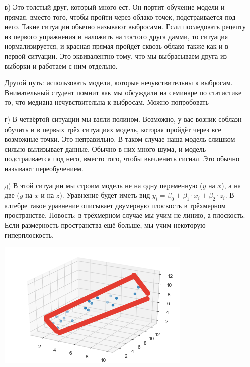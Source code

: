 \documentclass[12pt, a4paper, oneside]{article}
\begin{document}
{\begin{enumerate}
		\item[в)]  Это толстый друг, который много ест.  Он портит обучение модели и прямая, вместо того, чтобы пройти через облако точек, подстраивается под него. Такие ситуации обычно называют выбросами. Если последовать рецепту из первого упражнения и наложить на тостого друга дамми, то ситуация нормализируется, и красная прямая пройдёт сквозь облако также как и в первой ситуации. Это эквивалентно тому, что мы выбрасываем друга из выборки и работаем с ним отдельно.
		
		Другой путь: использовать модели, которые нечувствительны к выбросам. Внимательный студент помнит как мы обсуждали на семинаре по статистике то, что медиана нечувствительна к выбросам. Можно попробовать 
		
		\item[г)]  В четвёртой ситуации мы взяли полином. Возможно, у вас возник соблазн обучить и в первых трёх ситуациях модель, которая пройдёт через все возможные точки. Это неправильно. В таком случае наша модель слишком сильно вылизывает данные. Обычно в них много шума, и модель подстраивается под него, вместо того, чтобы вычленить сигнал. Это обычно называют переобучением.
		
		\item[д)]  В этой ситуации мы строим модель не на одну переменную ($y$ на $x$), а на две ($y$ на $x$ и на $z$). Уравнение будет иметь вид $y_i = \beta_0 + \beta_1 \cdot x_i + \beta_2 \cdot z_i$. В алгебре такое уравнение описывает двумерную плоскость в трёхмерном пространстве. Новость: в трёхмерном случае мы учим не линию, а плоскость. Если размерность пространства ещё больше, мы учим некоторую гиперплоскость. 
		
		\begin{center}
			\includegraphics[scale=0.8]{regr_pic_5_ans.png}
		\end{center}
		
	\end{enumerate}
}
\end{document}
